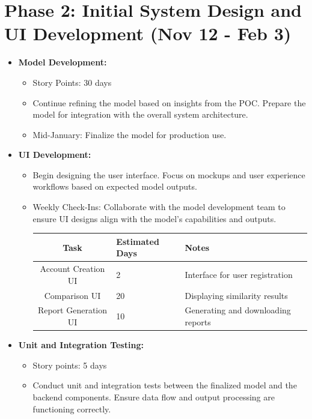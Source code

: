 \documentclass[12pt]{article}
\begin{document}
\section*{Phase 2: Initial System Design and UI Development (Nov 12 - Feb 3)}
\begin{itemize}
    \item \textbf{Model Development:}
    \begin{itemize}
        \item Story Points: 30 days
        \item Continue refining the model based on insights from the POC. Prepare the model for integration with the overall system architecture.
        \item Mid-January: Finalize the model for production use.
    \end{itemize}

    \item \textbf{UI Development:}
    \begin{itemize}
        \item Begin designing the user interface. Focus on mockups and user experience workflows based on expected model outputs.
        \item Weekly Check-Ins: Collaborate with the model development team to ensure UI designs align with the model's capabilities and outputs.


        \begin{tabular}{|c|p{4cm}|p{4cm}|p{4cm}|}
            \hline
            \textbf{Task} & \textbf{Estimated Days} & \textbf{Notes} \\
            \hline
            Account Creation UI & 2 & Interface for user registration \\
            \hline
            Comparison UI & 20 & Displaying similarity results \\
            \hline
            Report Generation UI & 10 & Generating and downloading reports \\
            \hline
        \end{tabular}
    \end{itemize}

    \item \textbf{Unit and Integration Testing:}
    \begin{itemize}
        \item Story points: 5 days
        \item Conduct unit and integration tests between the finalized model and the backend components. Ensure data flow and output processing are functioning correctly.
    \end{itemize}
\end{itemize}
\end{document}
